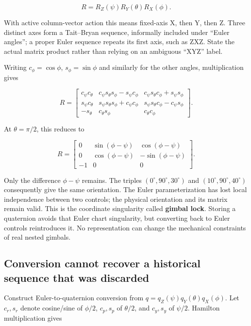 \[
R=R_Z(\psi)R_Y(\theta)R_X(\phi).
\]

With active column-vector action this means fixed-axis X, then Y, then Z. Three distinct axes form a Tait--Bryan sequence, informally included under ``Euler angles''; a proper Euler sequence repeats its first axis, such as ZXZ. State the actual matrix product rather than relying on an ambiguous ``XYZ'' label.

Writing \(c_\phi=\cos\phi\), \(s_\phi=\sin\phi\) and similarly for the other angles, multiplication gives

\[
R=\begin{bmatrix}
c_\psi c_\theta&c_\psi s_\theta s_\phi-s_\psi c_\phi&c_\psi s_\theta c_\phi+s_\psi s_\phi\\
s_\psi c_\theta&s_\psi s_\theta s_\phi+c_\psi c_\phi&s_\psi s_\theta c_\phi-c_\psi s_\phi\\
-s_\theta&c_\theta s_\phi&c_\theta c_\phi
\end{bmatrix}.
\]

At \(\theta=\pi/2\), this reduces to

\[
R=\begin{bmatrix}
0&\sin(\phi-\psi)&\cos(\phi-\psi)\\
0&\cos(\phi-\psi)&-\sin(\phi-\psi)\\
-1&0&0
\end{bmatrix}.
\]

Only the difference \(\phi-\psi\) remains. The triples \((0^\circ,90^\circ,30^\circ)\) and \((10^\circ,90^\circ,40^\circ)\) consequently give the same orientation. The Euler parameterization has lost local independence between two controls; the physical orientation and its matrix remain valid. This is the coordinate singularity called \textbf{gimbal lock}. Storing a quaternion avoids that Euler chart singularity, but converting back to Euler controls reintroduces it. No representation can change the mechanical constraints of real nested gimbals.

\subsection{Conversion cannot recover a historical sequence that was discarded}\label{01-foundations-i-ch019-conversion-cannot-recover-a-historical-sequence-that-was-discarded}

Construct Euler-to-quaternion conversion from \(q=q_Z(\psi)q_Y(\theta)q_X(\phi)\). Let \(c_r,s_r\) denote cosine/sine of \(\phi/2\), \(c_p,s_p\) of \(\theta/2\), and \(c_y,s_y\) of \(\psi/2\). Hamilton multiplication gives


